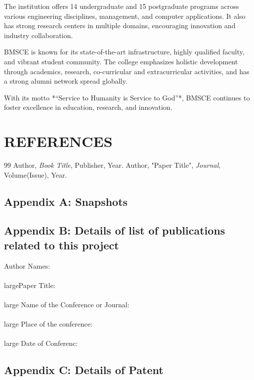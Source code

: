 \documentclass[12pt,a4paper]{report}
\begin{document}
The institution offers 14 undergraduate and 15 postgraduate programs across various 
engineering disciplines, management, and computer applications. It also has strong research 
centers in multiple domains, encouraging innovation and industry collaboration. 

BMSCE is known for its state-of-the-art infrastructure, highly qualified faculty, and vibrant 
student community. The college emphasizes holistic development through academics, research, 
co-curricular and extracurricular activities, and has a strong alumni network spread 
globally. 

With its motto *“Service to Humanity is Service to God”*, BMSCE continues to foster 
excellence in education, research, and innovation.



\clearpage
\chapter*{REFERENCES}
\begin{thebibliography}{99}
 Author, \textit{Book Title}, Publisher, Year.
 Author, "Paper Title", \textit{Journal}, Volume(Issue), Year.
\end{thebibliography}
\clearpage

\appendix
\renewcommand{\thechapter}{\Alph{chapter}}
\renewcommand{\thesection}{\Roman{section}}
\section {Appendix A: Snapshots}
\clearpage
\section {Appendix B: Details of list of publications related to this project}
\large{Author Names: } \\
\\large{Paper Title: } \\
\\large {Name of the Conference or Journal:} \\
\\large {Place of the conference:}\\ 
\\large {Date of Conferenc:}
\clearpage
\section {Appendix C: Details of Patent}
\clearpage
\end{document}
